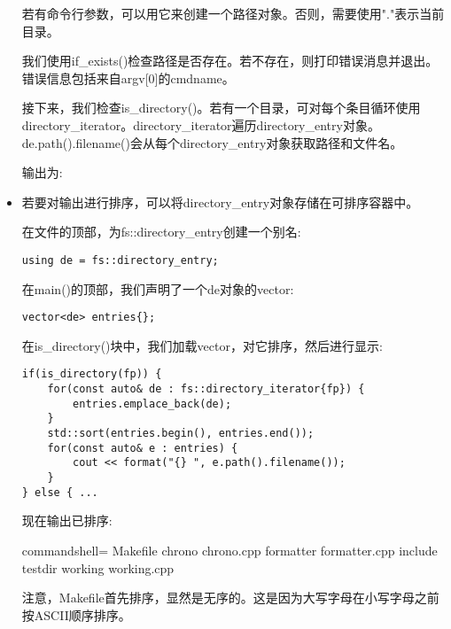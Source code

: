 \begin{itemize}
若有命令行参数，可以用它来创建一个路径对象。否则，需要使用"."表示当前目录。

我们使用if\_exists()检查路径是否存在。若不存在，则打印错误消息并退出。错误信息包括来自argv[0]的cmdname。

接下来，我们检查is\_directory()。若有一个目录，可对每个条目循环使用directory\_iterator。directory\_iterator遍历directory\_entry对象。de.path().filename()会从每个directory\_entry对象获取路径和文件名。

输出为:


\item 
若要对输出进行排序，可以将directory\_entry对象存储在可排序容器中。

在文件的顶部，为fs::directory\_entry创建一个别名:

\begin{lstlisting}[style=styleCXX]
using de = fs::directory_entry;
\end{lstlisting}

在main()的顶部，我们声明了一个de对象的vector:

\begin{lstlisting}[style=styleCXX]
vector<de> entries{};
\end{lstlisting}

在is\_directory()块中，我们加载vector，对它排序，然后进行显示:

\begin{lstlisting}[style=styleCXX]
if(is_directory(fp)) {
	for(const auto& de : fs::directory_iterator{fp}) {
		entries.emplace_back(de);
	}
	std::sort(entries.begin(), entries.end());
	for(const auto& e : entries) {
		cout << format("{} ", e.path().filename());
	}
} else { ...
\end{lstlisting}

现在输出已排序:

\begin{tcblisting}{commandshell={}}
Makefile chrono chrono.cpp formatter formatter.cpp
include testdir working working.cpp
\end{tcblisting}

注意，Makefile首先排序，显然是无序的。这是因为大写字母在小写字母之前按ASCII顺序排序。


\end{itemize}
